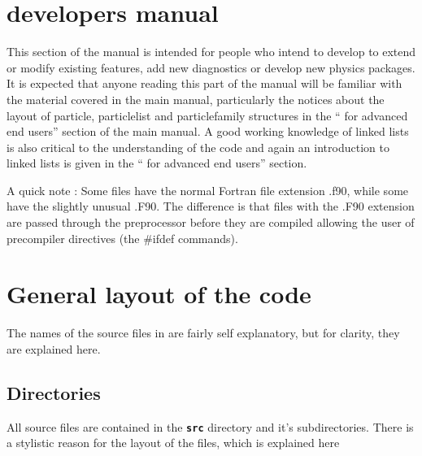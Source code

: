 \documentclass[12pt,a4paper]{article}
\newcommand{\inlinecode}[1]{{\color{warwickred} \bf\texttt{#1}}}
\newcommand{\EPOCH}{{\color{warwickdark}\fontfamily{phv}\selectfont{EPOCH}}}
\begin{document}
{
  \selectfont
}

\section{{\EPOCH} developers manual}
This section of the manual is intended for people who intend to develop {\EPOCH}
to extend or modify existing features, add new diagnostics or develop new
physics packages. It is expected that anyone reading this part of the manual
will be familiar with the material covered in the main manual, particularly
the notices about the layout of particle, particlelist and particlefamily
structures in the ``{\EPOCH} for advanced end users'' section of the main
manual. A good working knowledge of linked lists is also critical to the
understanding of the code and again an introduction to linked lists is given
in the ``{\EPOCH} for advanced end users'' section.

A quick note : Some files have the normal Fortran file extension .f90, while
some have the slightly unusual .F90. The difference is that files with the
.F90 extension are passed through the preprocessor before they are compiled
allowing the user of precompiler directives (the \#ifdef commands).

\section{General layout of the {\EPOCH} code}

The names of the source files in {\EPOCH} are fairly self explanatory, but for
clarity, they are explained here.

\subsection{Directories}
All source files are contained in the \inlinecode{src} directory and it's
subdirectories. There is a stylistic reason for the layout of the files, which
is explained here
\end{document}
